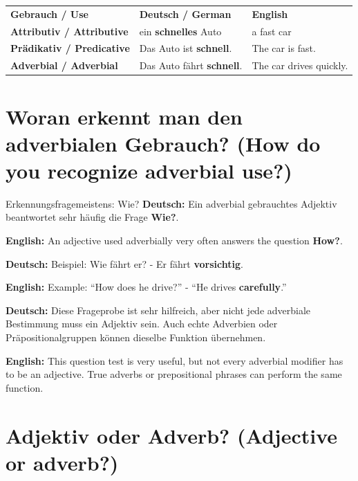\documentclass[a4paper,11pt]{article}
\newcommand{\GermanText}[1]{\textbf{Deutsch: }#1\par}
\newcommand{\EnglishText}[1]{{\small\color{SoftGray}\textbf{English: }#1\par}}
\begin{document}
        \begin{longtable}{>{\bfseries}p{3.5cm}|p{5.4cm}|p{5.4cm}}
            \rowcolor{HeaderBlueDark}
            \color{white}\textbf{Gebrauch / Use} &
            \color{white}\textbf{Deutsch / German} &
            \color{white}\textbf{English} \\
            Attributiv / Attributive & ein \textbf{schnelles} Auto & a fast car \\
            Prädikativ / Predicative & Das Auto ist \textbf{schnell}. & The car is fast. \\
            Adverbial / Adverbial & Das Auto fährt \textbf{schnell}. & The car drives quickly. \\
        \end{longtable}

    \section{Woran erkennt man den adverbialen Gebrauch? \textnormal{(How do you recognize adverbial use?)}}

        \begin{grammarentry}{Erkennungsfrage}{meistens: Wie?}
            \GermanText{Ein adverbial gebrauchtes Adjektiv beantwortet sehr häufig die Frage \textbf{Wie?}.}
            \EnglishText{An adjective used adverbially very often answers the question \textbf{How?}.}

            \GermanText{Beispiel: \glqq Wie fährt er?\grqq{} - \glqq Er fährt \textbf{vorsichtig}.\grqq}
            \EnglishText{Example: ``How does he drive?'' - ``He drives \textbf{carefully}.''}

            \GermanText{Diese Frageprobe ist sehr hilfreich, aber nicht jede adverbiale Bestimmung muss ein Adjektiv sein. Auch echte Adverbien oder Präpositionalgruppen können dieselbe Funktion übernehmen.}
            \EnglishText{This question test is very useful, but not every adverbial modifier has to be an adjective. True adverbs or prepositional phrases can perform the same function.}
        \end{grammarentry}

    \section{Adjektiv oder Adverb? \textnormal{(Adjective or adverb?)}}
\end{document}
